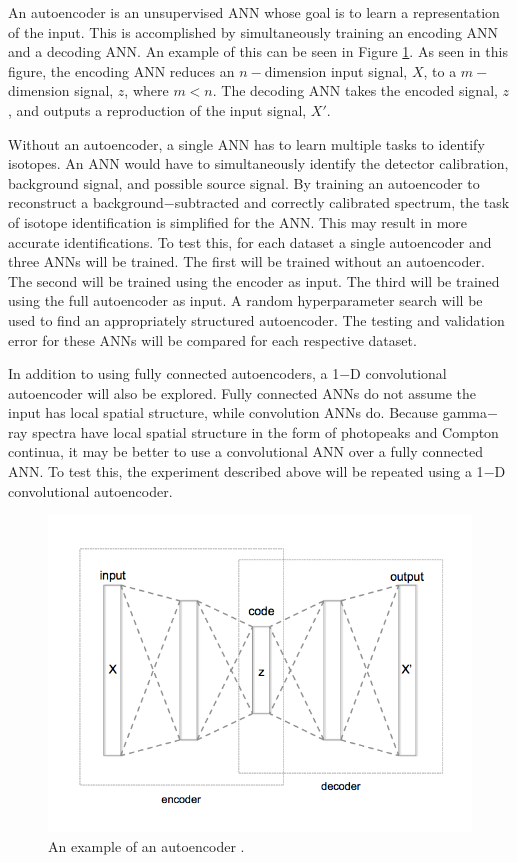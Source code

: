 \documentclass[tocnosub,noragright,centerchapter,12pt,fullpage]{uiucecethesis09}
\begin{document}
An autoencoder is an unsupervised ANN whose goal is to learn a representation of the input. This is accomplished by simultaneously training an encoding ANN and a decoding ANN. An example of this can be seen in Figure \ref{fig:Autoencoder_structure}. As seen in this figure, the encoding ANN reduces an $n-$dimension input signal, $X$, to a $m-$dimension signal, $z$, where $m < n$. The decoding ANN takes the encoded signal, $z$, and outputs a reproduction of the input signal, $X'$.


Without an autoencoder, a single ANN has to learn multiple tasks to identify isotopes. An ANN would have to simultaneously identify the detector calibration, background signal, and possible source signal. By training an autoencoder to reconstruct a background$-$subtracted and correctly calibrated spectrum, the task of isotope identification is simplified for the ANN. This may result in more accurate identifications. To test this, for each dataset a single autoencoder and three ANNs will be trained. The first will be trained without an autoencoder. The second will be trained using the encoder as input. The third will be trained using the full autoencoder as input. A random hyperparameter search will be used to find an appropriately structured autoencoder. The testing and validation error for these ANNs will be compared for each respective dataset.

In addition to using fully connected autoencoders, a 1$-$D convolutional autoencoder will also be explored. Fully connected ANNs do not assume the input has local spatial structure, while convolution ANNs do. Because gamma$-$ray spectra have local spatial structure in the form of photopeaks and Compton continua, it may be better to use a convolutional ANN over a fully connected ANN. To test this, the experiment described above will be repeated using a 1$-$D convolutional autoencoder.


\begin{figure}[H]
\centering
\includegraphics[width=0.8\linewidth]{images/Autoencoder_structure}
\caption{An example of an autoencoder \cite{wiki:AutoencoderStructure}.}
\label{fig:Autoencoder_structure}
\end{figure}
\end{document}
